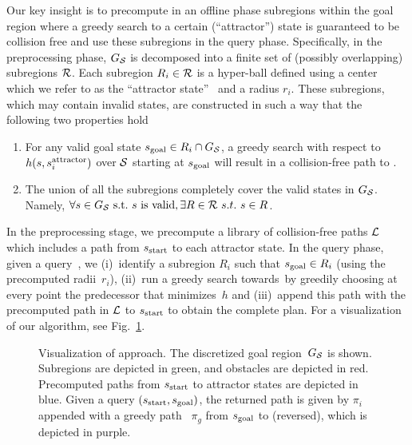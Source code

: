 \documentclass[a4paper]{report}
\begin{document}
Our key insight is to precompute in an offline phase subregions within the goal region where a greedy search to a certain (``attractor'') state is guaranteed to be collision free and use these subregions in the query phase.
Specifically, in the preprocessing phase, $G_\mathcal{S}$ is decomposed into a finite  set of (possibly overlapping) subregions $\mathcal{R}$.
Each subregion $R_i \in \mathcal{R}$ is a hyper-ball defined using a center which we refer to as the ``attractor state''~
\sAttract and a radius $r_i$.
These subregions, which may contain invalid states, are constructed in such a way that the following two properties hold
\begin{enumerate}[label={\textbf{P\arabic*}}]
  \item \label{property:1} For any valid goal state $s_{\text{goal}} \in R_i \cap G_\mathcal{S}$, a greedy search with respect to $h(s, s^{\text{attractor}}_i)$ over $\mathcal{S}$ starting at $s_{\text{goal}}$ will result in a collision-free path to \sAttract.
  \item \label{property:2} The union of all the subregions completely cover the valid states in $G_\mathcal{S}$. 
      Namely, $\forall s \in G_\mathcal{S}~\text{s.t.}~s~\text{is valid}, \exists R \in \mathcal{R} \ s.t. \ s \in R$.
\end{enumerate}

In the preprocessing stage, we precompute a library of collision-free paths $\mathcal{L}$ which includes a path from $s_{\textrm{start}}$ to each attractor state. 
In the query phase, given a query~\sGoal, we 
(i)~identify a subregion $R_i$ such that $s_{\text{goal}} \in R_i$ (using the precomputed radii~$r_i$),
(ii)~run a greedy search towards~\sAttract by greedily choosing at every point the predecessor that minimizes~$h$ and
(iii)~append this path with the precomputed path in $\mathcal{L}$ to $s_{\textrm{start}}$ to obtain the complete plan.
For a visualization of our algorithm, see Fig.~\ref{fig:approach}.


\begin{figure}
\centering
  \caption{
  Visualization of approach. The discretized goal region~$G_\mathcal{S}$ is shown. Subregions are depicted in green, and  obstacles are depicted in red.
  Precomputed paths from $s_{\rm{start}}$ to attractor states are depicted in blue.
 Given a query $(s_{\rm{start}}, s_{\rm{goal}})$, the returned path is given by $\pi_i$ appended with a greedy path ~$\pi_g$ from $s_{\rm{goal}}$ to \sAttract (reversed), which is depicted in purple.
}
    \label{fig:approach}
\end{figure}
\end{document}

